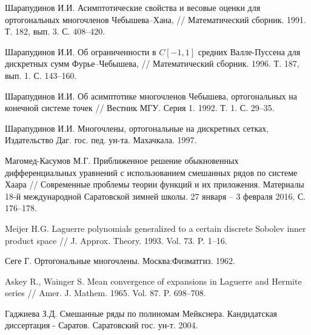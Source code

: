 \begin{thebibliography}{999}
Шарапудинов И.И.
Асимптотические свойства и весовые оценки для ортогональных многочленов Чебышева–Хана,
// Математический сборник. 1991. Т. 182, вып. 3. С. 408--420.





Шарапудинов И.И.
Об ограниченности в $C[-1,1]$ средних Валле-Пуссена для дискретных сумм Фурье–Чебышева,
// Математический сборник. 1996. Т. 187, вып. 1. С. 143--160.






Шарапудинов И.И.
Об асимптотике многочленов Чебышева, ортогональных на конечной системе точек //
Вестник МГУ. Серия 1. 1992. Т. 1. С. 29--35.





Шарапудинов И.И. Многочлены, ортогональные на дискретных сетках,
Издательство Даг. гос. пед. ун-та. Махачкала. 1997.





Магомед-Касумов М.Г.
Приближенное решение обыкновенных дифференциальных уравнений с использованием смешанных рядов по системе Хаара //
Современные проблемы теории функций и их приложения. Материалы 18-й международной Саратовской зимней школы.  27 января -- 3 февраля 2016, С. 176--178.





 Meijer H.G.  Laguerre polynomials generalized to a certain discrete Sobolev inner product space // J. Approx. Theory. 1993. Vol. 73. P. 1--16.




 Сеге Г. Ортогональные многочлены. Москва:Физматгиз. 1962.




 Askey R., Wainger S. Mean convergence of expansions in Laguerre and Hermite series // Amer. J. Mathem. 1965. Vol. 87. P. 698--708.

%
%
%


Гаджиева З.Д. Смешанные ряды по полиномам Мейкснера. Кандидатская диссертация - Саратов. Саратовский гос. ун-т. 2004.


%



\end{thebibliography}
